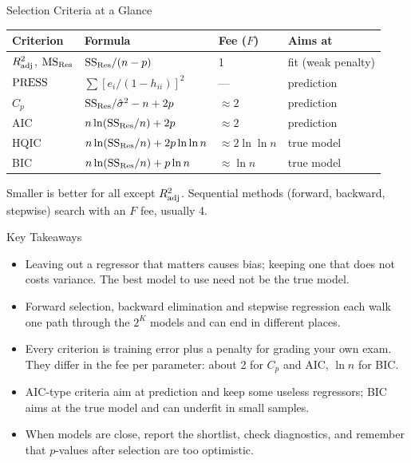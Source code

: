 \begin{frame}{Selection Criteria at a Glance}
    \begin{center}
        \footnotesize
        \setlength{\tabcolsep}{4pt}
        \begin{tabular}{llll}
            \toprule
            Criterion & Formula & Fee ($F$) & Aims at \\
            \midrule
            $R^2_{\mathrm{adj}}$, $\mathrm{MS}_{\mathrm{Res}}$ & $\mathrm{SS}_{\mathrm{Res}}/(n-p)$ & 1 & fit (weak penalty) \\
            $\mathrm{PRESS}$ & $\sum[e_i/(1-h_{ii})]^2$ & --- & prediction \\
            $C_p$ & $\mathrm{SS}_{\mathrm{Res}}/\hat\sigma^2-n+2p$ & $\approx2$ & prediction \\
            AIC & $n\ln(\mathrm{SS}_{\mathrm{Res}}/n)+2p$ & $\approx2$ & prediction \\
            HQIC & $n\ln(\mathrm{SS}_{\mathrm{Res}}/n)+2p\ln\ln n$ & $\approx2\ln\ln n$ & true model \\
            BIC & $n\ln(\mathrm{SS}_{\mathrm{Res}}/n)+p\ln n$ & $\approx\ln n$ & true model \\
            \bottomrule
        \end{tabular}
    \end{center}
    Smaller is better for all except $R^2_{\mathrm{adj}}$. Sequential methods (forward, backward, stepwise) search with an $F$ fee, usually 4.
\end{frame}


\begin{frame}{Key Takeaways}
    \begin{itemize}
        \item Leaving out a regressor that matters causes bias; keeping one that does not costs variance. The best model to use need not be the true model.
        \item Forward selection, backward elimination and stepwise regression each walk one path through the $2^K$ models and can end in different places.
        \item Every criterion is training error plus a penalty for grading your own exam. They differ in the fee per parameter: about 2 for $C_p$ and AIC, $\ln n$ for BIC.
        \item AIC-type criteria aim at prediction and keep some useless regressors; BIC aims at the true model and can underfit in small samples.
        \item When models are close, report the shortlist, check diagnostics, and remember that $p$-values after selection are too optimistic.
    \end{itemize}
\end{frame}

